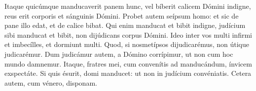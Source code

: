 
Itaque quicúmque manducaverit panem hunc, vel bíberit calicem Dómini indigne, reus erit corporis et sánguinis Dómini.
Probet autem seípsum homo: et sic de pane illo edat, et de calice bibat.
Qui enim manducat et bibit indigne, judícium sibi manducat et bibit, non dijúdicans corpus Dómini.
Ideo inter vos multi infirmi et imbecílles, et dormiunt multi.
Quod, si nosmetípsos dijudicarémus, non útique judicarémur.
Dum judicámur autem, a Dómino corrípimur, ut non cum hoc mundo damnemur.
Itaque, fratres mei, cum convenítis ad manducándum, ínvicem exspectáte.
Si quis ésurit, domi manducet: ut non in judícium convéniatis. Cetera autem, cum vénero, disponam.
\par